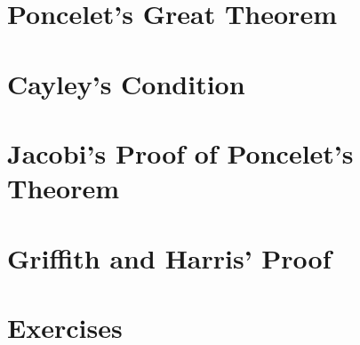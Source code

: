 \section{Poncelet's Great Theorem}
\label{sec:02-poncelet}


\section{Cayley's Condition}
\label{sec:02-cayley}


\section{Jacobi's Proof of Poncelet's Theorem}
\label{sec:02-jacobi}


\section{Griffith and Harris' Proof}
\label{sec:02-griffith-harris}


\section{Exercises}
\label{sec:02-exercises}


